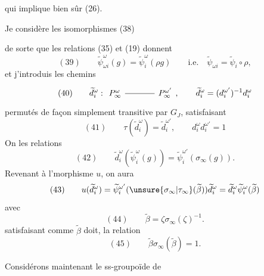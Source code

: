 qui implique bien sûr (26).

Je  considère les isomorphismes
\quad(38)

de sorte que les relations (35) et (19) donnent
\[
(39)\qquad \widetilde\psi_{\omega i}^\omega(g)=\widetilde\psi_i^\omega(\rho g)
\qquad\text{i.e.}\quad\widetilde\psi_{\omega i}=\widetilde\psi_i\circ\rho,
\]
et j'introduis les chemins
\[
(40)\qquad\widetilde d_i^\omega:
\begin{tikzcd}[ampersand replacement=\&,column sep=large]
P_{\infty}^\omega\arrow[r,no head]\&P_{\infty}^{\omega'}
\end{tikzcd},\qquad
\widetilde d_i^\omega=(d_i^{\omega'})^{-1}d_i^\omega
\]
permutés de façon simplement transitive par $G_J$,
 satisfaisant
\[
(41)\qquad\tau(\widetilde d_i^\omega)=\widetilde d_i^{\omega'},\qquad
 d_i^\omega d_i^{\omega'}=1
\]
On   les relations
\[
(42)\qquad\widetilde d_i^\omega(\widetilde\psi_i^\omega(g))=
\widetilde\psi_i^{\omega'}(\sigma_\infty(g)).
\]
Revenant à l'morphisme $u$, on aura 
\[
(43)\qquad u(\widetilde d_i^\omega)=\widetilde\psi_i^{\omega'}(\unsure{\sigma_\infty|\tau_\infty}(\widetilde\beta))\widetilde d_i^\omega
=\widetilde d_i^\omega\widetilde\psi_i^\omega(\widetilde\beta)
\]
avec
\[
(44)\qquad\widetilde\beta=\zeta\sigma_\infty(\zeta)^{-1}.
\]
satisfaisant   comme $\widetilde\beta$ doit, la relation
\[
(45)\qquad\widetilde\beta\sigma_\infty(\widetilde\beta)=1.
\]

Considérons maintenant le ss-groupoïde de
